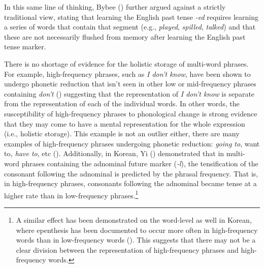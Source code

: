 \documentclass[
  12pt,
  letterpaper,
]{scrreprt}
\begin{document}
\noindent In this same line of thinking, Bybee
() further argued against a strictly
traditional view, stating that learning the English past tense
\emph{-ed} requires learning a series of words that contain that segment
(e.g., \emph{played}, \emph{spilled}, \emph{talked}) and that these are
not necessarily flushed from memory after learning the English past
tense marker.

There is no shortage of evidence for the holistic storage of multi-word
phrases. For example, high-frequency phrases, such as \emph{I don't
know}, have been shown to undergo phonetic reduction that isn't seen in
other low or mid-frequency phrases containing \emph{don't}
()
suggesting that the representation of \emph{I don't know} is separate
from the representation of each of the individual words. In other words,
the susceptibility of high-frequency phrases to phonological change is
strong evidence that they may come to have a mental representation for
the whole expression (i.e., holistic storage). This example is not an
outlier either, there are many examples of high-frequency phrases
undergoing phonetic reduction: \emph{going to}, want to\emph{, have to},
etc (). Additionally, in Korean, Yi
() demonstrated that in multi-word
phrases containing the adnominal future marker (\emph{-l}), the
tensification of the consonant following the adnominal is predicted by
the phrasal frequency. That is, in high-frequency phrases, consonants
following the adnominal became tense at a higher rate than in
low-frequency phrases.\footnote{A similar effect has been demonstrated
  on the word-level as well in Korean, where epenthesis has been
  documented to occur more often in high-frequency words than in
  low-frequency words
  (). This suggests that there may not be a clear
  division between the representation of high-frequency phrases and
  high-frequency words.}
\end{document}
